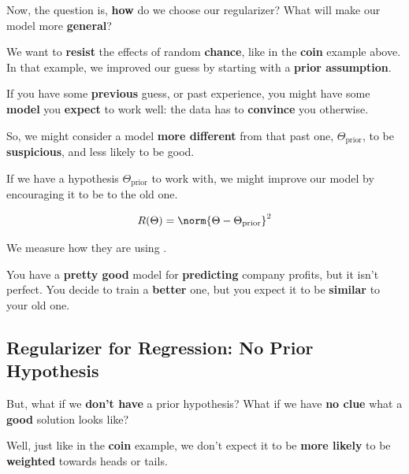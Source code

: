         Now, the question is, \textbf{how} do we choose our regularizer? What will make our model more \textbf{general}?
        
        We want to \textbf{resist} the effects of random \textbf{chance}, like in the \textbf{coin} example above. In that example, we improved our guess by starting with a \textbf{prior assumption}.
        
        If you have some \textbf{previous} guess, or past experience, you might have some \textbf{model} you \textbf{expect} to work well: the data has to \textbf{convince} you otherwise.
        
        So, we might consider a model \textbf{more different} from that past one, $\Theta_{\text{prior}}$, to be \textbf{suspicious}, and less likely to be good.\\
        
        \begin{concept}
            If we have a  hypothesis $\Theta_{\text{prior}}$ to work with, we might improve our  model by encouraging it to be  to the old one.
            
            \begin{equation*}
                R(\Theta)= \norm{ \Theta - \Theta_{\text{prior}} }^2
            \end{equation*}
            
            We measure how  they are using .
            
        \end{concept}
        
        \miniex You have a \textbf{pretty good} model for \textbf{predicting} company profits, but it isn't perfect. You decide to train a \textbf{better} one, but you expect it to be \textbf{similar} to your old one.
        
        
    \subsection{Regularizer for Regression: No Prior Hypothesis}
    
        But, what if we \textbf{don't have} a prior hypothesis? What if we have \textbf{no clue} what a \textbf{good} solution looks like?
        
        Well, just like in the \textbf{coin} example, we don't expect it to be \textbf{more likely} to be \textbf{weighted} towards heads or tails.
        
